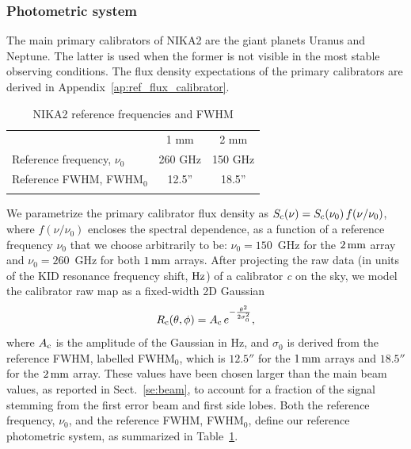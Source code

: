 \subsubsection{Photometric system}
\label{se:photometric_system}

The main primary calibrators of NIKA2 are the giant planets Uranus and
Neptune. The latter is used when the former is not visible in the most
stable observing conditions. The flux density expectations of the
primary calibrators are derived in Appendix~\ref{ap:ref_flux_calibrator}. 
%
\begin{table}[!htbp]
\caption{NIKA2 reference frequencies and FWHM}
\label{tab:definitions}
\centering     
\begin{tabular}{lcc}
\hline\hline
      \noalign{\smallskip}
      & 1 mm & 2 mm \\
      \noalign{\smallskip}
      \hline
      \noalign{\smallskip}
      Reference frequency, $\nu_{0}$ & 260 GHz & 150 GHz \\
      Reference FWHM,  FWHM$_{0}$    & 12.5'' & 18.5'' \\
      \noalign{\smallskip}
      \hline
\end{tabular}
\end{table}

We parametrize the primary calibrator flux density as 
$S_{\rm{c}}(\nu) = S_{\rm{c}}(\nu_0)\, f(\nu/\nu_{0})$, where $f(\nu/\nu_{0})$
encloses the spectral dependence, 
as a function of a reference frequency $\nu_{0}$ that we choose
arbitrarily to be: $\nu_{0} = 150$~GHz for the $2\,\rm{mm}$ array and
$\nu_{0}= 260$~GHz for both $1\,\rm{mm}$ arrays. After projecting the raw
data (in units of the KID resonance frequency shift, $\rm Hz$) of a
calibrator {\sl c} on the sky, we model the calibrator raw map as a
fixed-width 2D Gaussian
\begin{equation}
  R_{\rm{c}}(\theta, \phi)  = A_{\rm{c}} \, e^{-\frac{\theta^{2}}{2\sigma_{0}^{2}}},
  \label{eq:gaussian_amplitude}
\end{equation}
{\lp where $A_{\rm{c}}$ is the amplitude of the 
Gaussian in Hz,} and $\sigma_{0}$ is derived from the
reference FWHM, labelled FWHM$_{0}$, which is $12.5''$ for the $1\, \rm{mm}$
arrays and $18.5''$ for the $2\,\rm{mm}$ array. These values have
been chosen larger than the main beam values, as reported in
Sect.~\ref{se:beam}, to account for a fraction of the signal stemming from
the first error beam and first side lobes.
Both the reference frequency, $\nu_0$, and the reference FWHM, FWHM$_{0}$, define
our reference photometric system, as summarized in Table~\ref{tab:definitions}.

